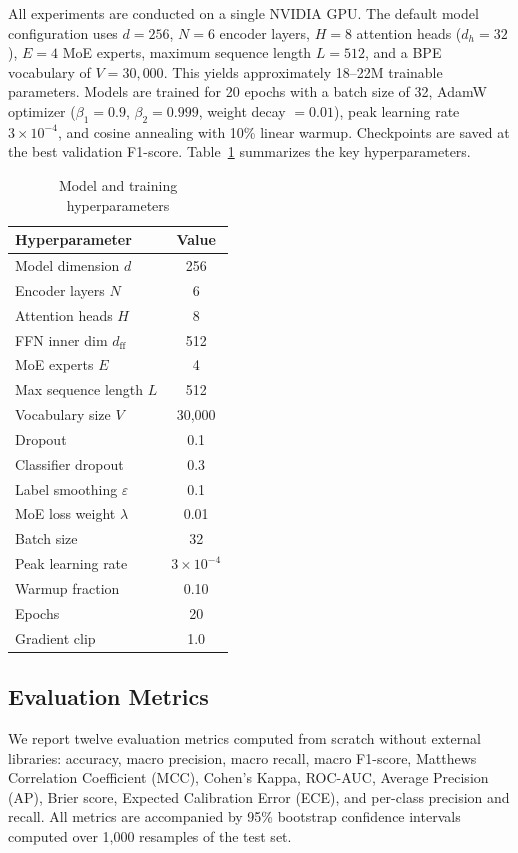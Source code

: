 \documentclass[conference]{IEEEtran}
\begin{document}
All experiments are conducted on a single NVIDIA GPU. The default model configuration uses $d = 256$, $N = 6$ encoder layers, $H = 8$ attention heads ($d_h = 32$), $E = 4$ MoE experts, maximum sequence length $L = 512$, and a BPE vocabulary of $V = 30{,}000$. This yields approximately 18--22M trainable parameters. Models are trained for 20 epochs with a batch size of 32, AdamW optimizer ($\beta_1 = 0.9$, $\beta_2 = 0.999$, weight decay $= 0.01$), peak learning rate $3 \times 10^{-4}$, and cosine annealing with 10\% linear warmup. Checkpoints are saved at the best validation F1-score. Table~\ref{tab:hyperparams} summarizes the key hyperparameters.

\begin{table}[H]
\centering
\caption{Model and training hyperparameters}
\label{tab:hyperparams}
\begin{tabular}{|l|c|}
\hline
\textbf{Hyperparameter} & \textbf{Value} \\
\hline
Model dimension $d$ & 256 \\
Encoder layers $N$ & 6 \\
Attention heads $H$ & 8 \\
FFN inner dim $d_{\text{ff}}$ & 512 \\
MoE experts $E$ & 4 \\
Max sequence length $L$ & 512 \\
Vocabulary size $V$ & 30,000 \\
Dropout & 0.1 \\
Classifier dropout & 0.3 \\
Label smoothing $\varepsilon$ & 0.1 \\
MoE loss weight $\lambda$ & 0.01 \\
Batch size & 32 \\
Peak learning rate & $3 \times 10^{-4}$ \\
Warmup fraction & 0.10 \\
Epochs & 20 \\
Gradient clip & 1.0 \\
\hline
\end{tabular}
\end{table}

\subsection{Evaluation Metrics}

We report twelve evaluation metrics computed from scratch without external libraries: accuracy, macro precision, macro recall, macro F1-score, Matthews Correlation Coefficient (MCC), Cohen's Kappa, ROC-AUC, Average Precision (AP), Brier score, Expected Calibration Error (ECE), and per-class precision and recall. All metrics are accompanied by 95\% bootstrap confidence intervals computed over 1,000 resamples of the test set.
\end{document}
